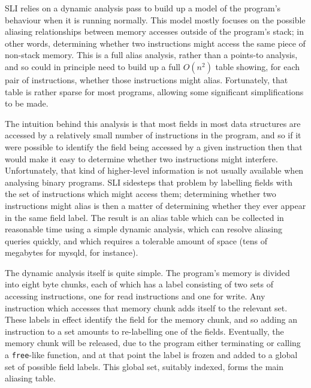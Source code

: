 SLI relies on a dynamic analysis pass to build up a model of the
program's behaviour when it is running normally.  This model mostly
focuses on the possible aliasing relationships between memory accesses
outside of the program's stack; in other words, determining whether
two instructions might access the same piece of non-stack memory.
This is a full alias analysis, rather than a points-to analysis, and
so could in principle need to build up a full $O(n^2)$ table showing,
for each pair of instructions, whether those instructions might alias.
Fortunately, that table is rather sparse for most programs, allowing
some significant simplifications to be made.

The intuition behind this analysis is that most fields in most data
structures are accessed by a relatively small number of instructions
in the program, and so if it were possible to identify the field being
accessed by a given instruction then that would make it easy to
determine whether two instructions might interfere.
Unfortunately, that kind of higher-level information is not usually
available when analysing binary programs.  SLI sidesteps that problem
by labelling fields with the set of instructions which might access
them; determining whether two instructions might alias is then a
matter of determining whether they ever appear in the same field
label.  The result is an alias table which can be collected in
reasonable time using a simple dynamic analysis, which can resolve
aliasing queries quickly, and which requires a tolerable amount of
space (tens of megabytes for mysqld, for instance).

The dynamic analysis itself is quite simple.  The program's memory is
divided into eight byte chunks, each of which has a label consisting
of two sets of accessing instructions, one for read instructions and
one for write.  Any instruction which accesses that memory chunk adds
itself to the relevant set.  These labels in effect identify the field for
the memory chunk, and so adding an instruction to a set amounts to
re-labelling one of the fields.  Eventually, the memory chunk will be
released, due to the program either terminating or calling a
\verb|free|-like function, and at that point the label is frozen and
added to a global set of possible field labels.  This global set,
suitably indexed, forms the main aliasing table.

